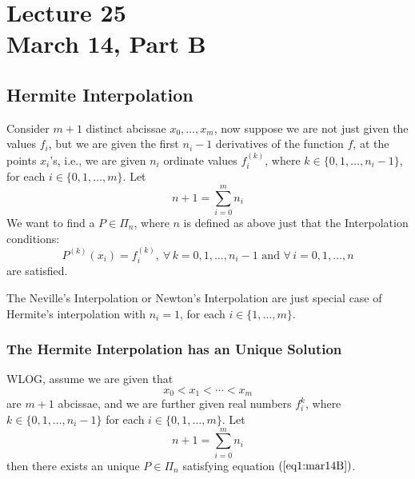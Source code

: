 \chapter*{Lecture 25 \\ March 14, Part B}
\setcounter{chapter}{25}
\setcounter{equation}{0}
\setcounter{section}{0}

\section{Hermite Interpolation}

Consider $m+1$ distinct abcissae $x_0, \dots, x_m$, now suppose we are not just given the values $f_i$, but we are given the first $n_i-1$ derivatives of the function $f$, at the points $x_i$'s, i.e., we are given $n_i$ ordinate values $f_i^{(k)}$, where $k \in \{0,1,\dots,n_i-1\}$, for each $i \in \{0,1,\dots,m\}$. Let 
\[
    n+1 = \sum_{i=0}^m n_i    
\]
We want to find a $P \in \Pi_n$, where $n$ is defined as above just that the Interpolation conditions:
\begin{equation}\label{eq1:mar14B}
    P^{(k)}(x_i) = f_i^{(k)}, \ \forall \, k = 0,1,\dots,n_i-1 \mbox{ and } \forall \, i = 0,1,\dots,n
\end{equation}
are satisfied. 
\begin{rmk}
    The Neville's Interpolation or Newton's Interpolation are just special case of Hermite's interpolation with $n_i = 1$, for each $i \in \{1,\dots,m\}$.
\end{rmk}

\subsection{The Hermite Interpolation has an Unique Solution}

\begin{thm}\label{thm1:mar14B}
    WLOG, assume we are given that 
    \[
        x_0 < x_1 < \cdots < x_m  
    \]
    are $m+1$ abcissae, and we are further given real numbers $f_i^{k}$, where $k \in \{0,1,\dots,n_i-1\}$ for each $i \in \{0,1,\dots,m\}$. Let 
    \[
        n+1 = \sum_{i=0}^m n_i  
    \]
    then there exists an unique $ P \in \Pi_n$ satisfying equation $(\ref{eq1:mar14B})$.
\end{thm}

